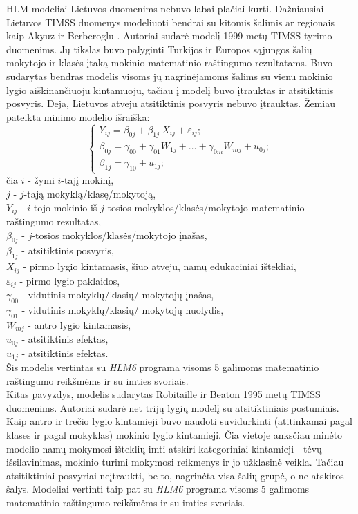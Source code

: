 \documentclass[12pt,a4paper]{article}
\begin{document}
\indent HLM modeliai Lietuvos duomenims nebuvo labai plačiai kurti. Dažniausiai Lietuvos TIMSS duomenys modeliuoti bendrai su kitomis šalimis ar regionais kaip Akyuz ir Berberoglu \cite{2007All}. Autoriai sudarė modelį 1999 metų TIMSS tyrimo duomenims. Jų tikslas buvo palyginti Turkijos ir Europos sąjungos šalių mokytojo ir klasės įtaką mokinio matematinio raštingumo rezultatams. Buvo sudarytas bendras modelis visoms jų nagrinėjamoms šalims su vienu mokinio lygio aiškinančiuoju kintamuoju, tačiau į modelį buvo įtrauktas ir atsitiktinis posvyris. Deja, Lietuvos atveju atsitiktinis posvyris nebuvo įtrauktas. Žemiau pateikta minimo modelio išraiška:
\[ \left\{
\begin{array}{l}
Y_{ij} = \beta_{0j}+\beta_{1j}\ X_{ij}+\varepsilon_{ij}; \\
\beta_{0j} = \gamma_{00} + \gamma_{01} W_{1j}+\dots+\gamma_{0m} W_{mj}+u_{0j};\\
\beta_{1j} = \gamma_{10} + u_{1j};
\end{array} \right.
\]
\small
čia $i$ - žymi $i$-tajį mokinį,\\
$j$ - $j$-tają mokyklą/klasę/mokytoją,\\
$Y_{ij}$ - $i$-tojo mokinio iš $j$-tosios mokyklos/klasės/mokytojo matematinio raštingumo rezultatas,\\
$\beta_{0j}$ - $j$-tosios mokyklos/klasės/mokytojo įnašas,\\
$\beta_{1j}$ - atsitiktinis posvyris,\\
$X_{ij}$ - pirmo lygio kintamasis, šiuo atveju, namų edukaciniai ištekliai, \\
$\varepsilon_{ij}$ - pirmo lygio paklaidos,\\
$\gamma_{00}$ - vidutinis mokyklų/klasių/ mokytojų įnašas,\\
$\gamma_{01}$ - vidutinis mokyklų/klasių/ mokytojų nuolydis,\\
$W_{mj}$ - antro lygio kintamasis, \\
$u_{0j}$ - atsitiktinis efektas,\\
$u_{1j}$ - atsitiktinis efektas.\\
Šis modelis vertintas su \textit{HLM6} programa visoms 5 galimoms matematinio raštingumo reikšmėms ir su imties svoriais.\\
\indent Kitas pavyzdys, modelis sudarytas Robitaille ir Beaton \cite{timssLiet} 1995 metų TIMSS duomenims. Autoriai sudarė net trijų lygių modelį su atsitiktiniais postūmiais. Kaip antro ir trečio lygio kintamieji buvo naudoti suvidurkinti (atitinkamai pagal klases ir pagal mokyklas) mokinio lygio kintamieji. Čia vietoje anksčiau minėto modelio namų mokymosi išteklių imti atskiri kategoriniai kintamieji - tėvų išsilavinimas, mokinio turimi mokymosi reikmenys ir jo užklasinė veikla. Tačiau atsitiktiniai posvyriai neįtraukti, be to, nagrinėta visa šalių grupė, o ne atskiros šalys. Modeliai vertinti taip pat su \textit{HLM6} programa visoms 5 galimoms matematinio raštingumo reikšmėms ir su imties svoriais.
\end{document}
